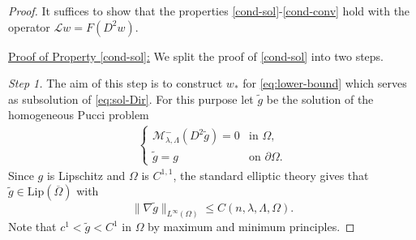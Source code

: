 \documentclass[11pt,oneside,english]{amsart}
\newcommand{\cM}{{\mathcal M}}
\newcommand{\cL}{{\mathcal L}}
\newcommand{\la}{\lambda}
\newcommand{\D}{\nabla}
\numberwithin{equation}{section}
\theoremstyle{plain}
\numberwithin{equation}{section}
\begin{document}
\begin{proof}
It suffices to show that the properties \ref{cond-sol}-\ref{cond-conv} hold with the operator $\cL w=F(D^2w)$. 


\medskip

\noindent
\underline{Proof of Property  \ref{cond-sol}:}
We split the proof of \ref{cond-sol} into two steps.


\medskip\noindent\emph{Step 1.} The aim of this step is to construct $w_*$ for \eqref{eq:lower-bound} which serves as subsolution  of \eqref{eq:sol-Dir}.  For this purpose let $\tilde g$ be the solution of the homogeneous Pucci problem
\begin{align}\label{eq:g-tilde}
    \begin{cases}
        \cM^-_{\la,\Lambda}(D^2\tilde g)=0&\text{in }\Omega,\\
        \tilde g=g&\text{on }\partial\Omega.
    \end{cases}
\end{align}
Since $g$ is Lipschitz and $\Omega$ is $C^{1,1}$, the standard elliptic theory gives that $\tilde g\in \text{Lip}(\overline{\Omega})$ with
$$
\|\D\tilde g\|_{L^\infty(\Omega)}\le C(n,\la,\Lambda,\Omega).
$$
Note that $c^1<\tilde g<C^1$ in $\Omega$ by maximum and minimum principles.


\end{proof}
\end{document}
